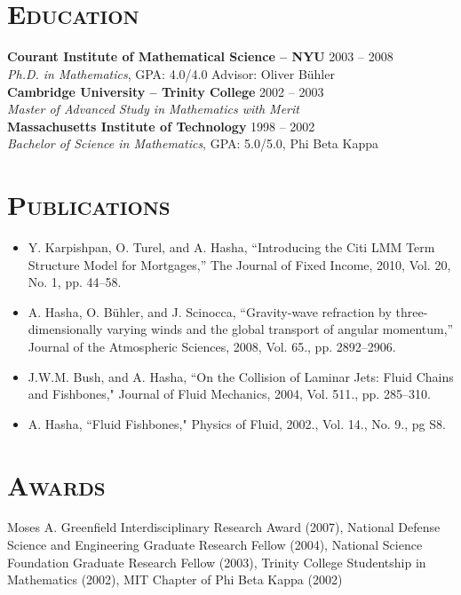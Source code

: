 \begin{resume}
\begin{formatb}
  \\
  \body\\
\end{formatb}

\section{\textsc{Education}}

\textbf{Courant Institute of Mathematical Science -- NYU} \hfill 2003 -- 2008 \\
\textit{Ph.D. in Mathematics}, GPA: 4.0/4.0 \hfill Advisor: Oliver B\"uhler \\
\newline
\textbf{Cambridge University -- Trinity College} \hfill 2002 -- 2003 \\ 
\textit{Master of Advanced Study in Mathematics with Merit} \\
\newline
\textbf{Massachusetts Institute of Technology} \hfill 1998 -- 2002 \\
\textit{Bachelor of Science in Mathematics}, GPA: 5.0/5.0, Phi Beta Kappa\\

\section{\textsc{Publications}}
\begin{itemize}
\item Y. Karpishpan, O. Turel, and A. Hasha, ``Introducing the Citi LMM Term Structure Model for Mortgages,''
The Journal of Fixed Income, 2010, Vol. 20, No. 1, pp. \mbox{44--58}.
\item A. Hasha, O. B\"uhler, and J. Scinocca,  ``Gravity-wave refraction by three-dimensionally 
varying winds and the global transport of angular momentum,''  
Journal of the Atmospheric Sciences, 2008, Vol. 65., pp.
\mbox{2892--2906}.
\item J.W.M. Bush, and A. Hasha, ``On the Collision of Laminar Jets:  Fluid Chains and Fishbones,"  Journal of Fluid Mechanics, 2004, Vol. 511., pp. 285--310.
\item A. Hasha, ``Fluid Fishbones," Physics of Fluid, 2002., Vol. 14., No. 9., pg S8.
\end{itemize}

\section{\textsc{Awards}}
Moses A. Greenfield Interdisciplinary Research Award (2007), National Defense Science and Engineering Graduate Research Fellow (2004), National Science Foundation Graduate Research Fellow (2003), Trinity College Studentship in Mathematics (2002), MIT Chapter of Phi Beta Kappa (2002)


\end{resume}

